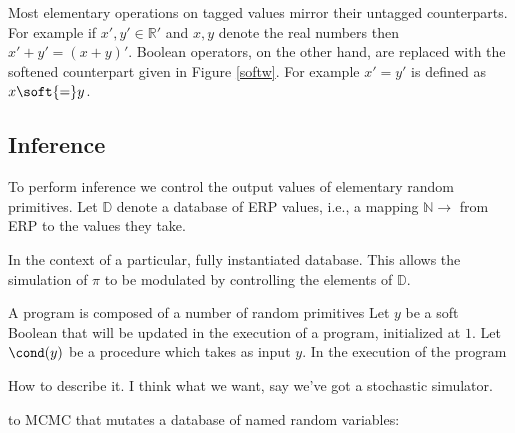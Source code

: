 Most elementary operations on tagged values mirror their untagged counterparts.
For example if $x', y' \in \mathbb{R}'$ and $x, y$ denote the real numbers then $x'+ y' = (x + y)'$.
Boolean operators, on the other hand, are replaced with the softened counterpart given in Figure \ref{softw}.
For example $x' = y'$ is defined as $x \soft{=} y$.


\subsection{Inference}

To perform inference we control the output values of elementary random primitives.
Let $\mathbb{D}$ denote a database of ERP values, i.e., a mapping $\mathbb{N } \to $ from ERP to the values they take. 

In the context of a particular, fully instantiated database.
This allows the simulation of $\pi$ to be modulated by controlling the elements of $\mathbb{D}$.




A program is composed of a number of random primitives
Let $y$ be a soft Boolean that will be updated in the execution of a program, initialized at $1$. 
Let $\cond(y)$ be a procedure which takes as input $y$.
In the execution of the program

How to describe it.  I think what we want,
say we've got a stochastic simulator.

to MCMC that mutates a database of named random variables: